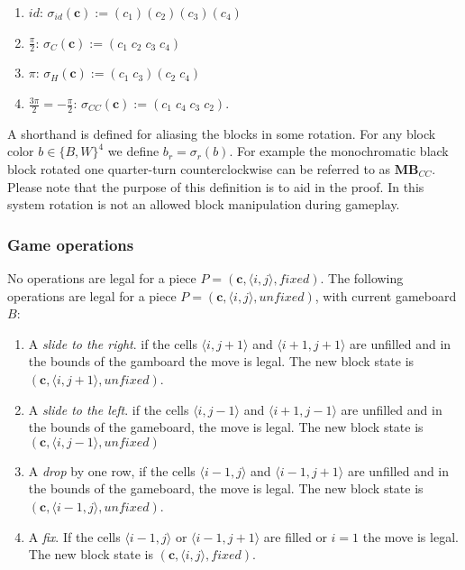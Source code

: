 \begin{description}[style=unboxed, leftmargin=0cm,labelsep=1em]
    \begin{enumerate}
        \item $id$: $\sigma_{id}(\mathbf{c}) := (c_1)(c_2)(c_3)(c_4)$
        \item $\frac{\pi}{2}$: $\sigma_{C}(\mathbf{c}) := (c_1\;c_2\;c_3\;c_4)$
        \item $\pi$: $\sigma_{H}(\mathbf{c}) := (c_1\;c_3)(c_2\;c_4)$
        \item $\frac{3 \pi}{2} = -\frac{\pi}{2}$: $\sigma_{CC}(\mathbf{c}) := (c_1\;c_4\;c_3\;c_2)$.
    \end{enumerate}

    A shorthand is defined for aliasing the blocks in some rotation. For any block color $b \in \{B, W\}^4$ we define $b_{r} = \sigma_{r}(b)$. For example the monochromatic black block rotated one quarter-turn counterclockwise can be referred to as $\mathbf{MB}_{CC}$. Please note that the purpose of this definition is to aid in the proof. In this system rotation is not an allowed block manipulation during gameplay.
\end{description}
\subsubsection{Game operations}
\label{subsub:operations}

No operations are legal for a piece $P = (\mathbf{c}, \langle i,j \rangle, fixed)$. The following operations are legal for a piece $P = (\mathbf{c}, \langle i,j \rangle, unfixed)$, with current gameboard $B$:

    \begin{enumerate}
        \item A \emph{slide to the right}. if the cells $\langle i,j+1 \rangle$ and $\langle i+1, j+1 \rangle$ are unfilled and in the bounds of the gamboard the move is legal. The new block state is $(\mathbf{c}, \langle i, j+1 \rangle, unfixed)$.
    \item A \emph{slide to the left}. if the cells $\langle i,j-1 \rangle$ and $\langle i+1, j-1 \rangle$ are unfilled and in the bounds of the gameboard, the move is legal. The new block state is $(\mathbf{c}, \langle i, j-1 \rangle, unfixed)$
\item A \emph{drop} by one row, if the cells $\langle i-1, j \rangle$ and $\langle i-1, j+1 \rangle$ are unfilled and in the bounds of the gameboard, the move is legal. The new block state is $(\mathbf{c}, \langle i-1, j \rangle, unfixed)$.
        \item A \emph{fix}. If the cells $\langle i-1, j \rangle$ or $\langle i-1, j+1 \rangle$ are filled or $i=1$ the move is legal. The new block state is $(\mathbf{c}, \langle i, j \rangle, fixed)$.
    \end{enumerate}


